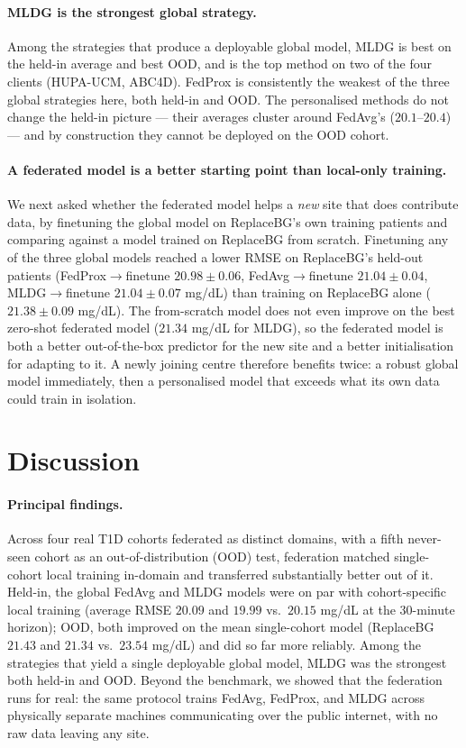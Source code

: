 \documentclass[10pt,letterpaper]{article}
\begin{document}
\paragraph{MLDG is the strongest global strategy.} Among the strategies that
produce a deployable global model, MLDG is best on the held-in average and best
OOD, and is the top method on two of the four clients (HUPA-UCM, ABC4D). FedProx
is consistently the weakest of the three global strategies here, both held-in and
OOD. The personalised methods do not change the held-in picture --- their
averages cluster around FedAvg's ($20.1$--$20.4$) --- and by construction they
cannot be deployed on the OOD cohort.

\paragraph{A federated model is a better starting point than local-only
training.} We next asked whether the federated model helps a \emph{new} site
that does contribute data, by finetuning the global model on ReplaceBG's own
training patients and comparing against a model trained on ReplaceBG from
scratch. Finetuning any of the three global models reached a lower RMSE on
ReplaceBG's held-out patients (FedProx$\rightarrow$finetune $20.98 \pm 0.06$,
FedAvg$\rightarrow$finetune $21.04 \pm 0.04$, MLDG$\rightarrow$finetune
$21.04 \pm 0.07$ mg/dL) than training on ReplaceBG alone
($21.38 \pm 0.09$ mg/dL). The from-scratch model does not even improve on the
best zero-shot federated model ($21.34$ mg/dL for MLDG), so the federated model
is both a better out-of-the-box predictor for the new site and a better
initialisation for adapting to it. A newly joining centre therefore benefits
twice: a robust global model immediately, then a personalised model that
exceeds what its own data could train in isolation.

\section*{Discussion}

\paragraph{Principal findings.} Across four real T1D cohorts federated as
distinct domains, with a fifth never-seen cohort as an out-of-distribution (OOD)
test, federation matched single-cohort local training in-domain and transferred
substantially better out of it. Held-in, the global FedAvg and MLDG models were
on par with cohort-specific local training (average RMSE $20.09$ and $19.99$
vs.\ $20.15$ mg/dL at the 30-minute horizon); OOD, both improved on the mean
single-cohort model (ReplaceBG $21.43$ and $21.34$ vs.\ $23.54$ mg/dL) and did
so far more reliably. Among the strategies that yield a single deployable global
model, MLDG was the strongest both held-in and OOD. Beyond the benchmark, we
showed that the federation runs for real: the same protocol trains FedAvg,
FedProx, and MLDG across physically separate machines communicating over the
public internet, with no raw data leaving any site.
\end{document}

